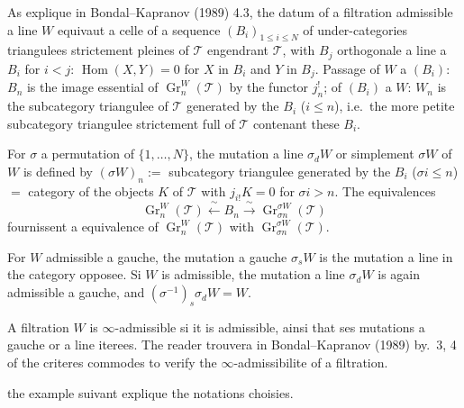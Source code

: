 \documentclass[11pt,a4paper]{article}
\theoremstyle{plain}
\theoremstyle{definition}
\DeclareMathOperator{\Hom}{Hom}
\DeclareMathOperator{\Gr}{Gr}
\newcommand{\cT}{\mathscr{T}}
\begin{document}
As explique in Bondal--Kapranov (1989) 4.3, the datum of a filtration admissible a line $W$ equivaut a celle of a sequence $(B_i)_{1 \leq i \leq N}$ of under-categories triangulees strictement pleines of $\cT$ engendrant $\cT$, with $B_j$ orthogonale a line a $B_i$ for $i < j$: $\Hom(X,Y) = 0$ for $X$ in $B_i$ and $Y$ in $B_j$. Passage of $W$ a $(B_i)$: $B_n$ is the image essential of $\Gr_n^W(\cT)$ by the functor $j_n^!$; of $(B_i)$ a $W$: $W_n$ is the subcategory triangulee of $\cT$ generated by the $B_i$ ($i \leq n$), i.e.\ the more petite subcategory triangulee strictement full of $\cT$ contenant these $B_i$.

For $\sigma$ a permutation of $\{1,\ldots,N\}$, the mutation a line $\sigma_d W$ or simplement $\sigma W$ of $W$ is defined by $(\sigma W)_n :=$ subcategory triangulee generated by the $B_i$ ($\sigma i \leq n$) $=$ category of the objects $K$ of $\cT$ with $j_{i!} K = 0$ for $\sigma i > n$. The equivalences
\begin{equation}\label{eq:0.2}
\Gr_n^W(\cT) \xleftarrow{\;\sim\;} B_n \xrightarrow{\;\sim\;} \Gr_{\sigma n}^{\sigma W}(\cT)
\tag{0.2}
\end{equation}
fournissent a equivalence of $\Gr_n^W(\cT)$ with $\Gr_{\sigma n}^{\sigma W}(\cT)$.

For $W$ admissible a gauche, the mutation a gauche $\sigma_s W$ is the mutation a line in the category opposee. Si $W$ is admissible, the mutation a line $\sigma_d W$ is again admissible a gauche, and $(\sigma^{-1})_s \sigma_d W = W$.

A filtration $W$ is $\infty$-admissible si it is admissible, ainsi that ses mutations a gauche or a line iterees. The reader trouvera in Bondal--Kapranov (1989) by.~3, 4 of the criteres commodes to verify the $\infty$-admissibilite of a filtration.

the example suivant explique the notations choisies.
\end{document}
